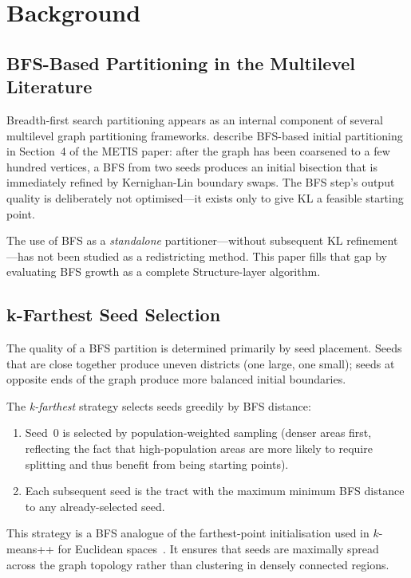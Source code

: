 \section{Background}
\label{sec:background}

\subsection{BFS-Based Partitioning in the Multilevel Literature}

Breadth-first search partitioning appears as an internal component of
several multilevel graph partitioning frameworks.
\citet{karypis1998} describe BFS-based initial partitioning in Section~4
of the METIS paper: after the graph has been coarsened to a few hundred
vertices, a BFS from two seeds produces an initial bisection that is
immediately refined by Kernighan-Lin boundary swaps.
The BFS step's output quality is deliberately not optimised---it exists
only to give KL a feasible starting point.

The use of BFS as a \emph{standalone} partitioner---without subsequent
KL refinement---has not been studied as a redistricting method.
This paper fills that gap by evaluating BFS growth as a complete
Structure-layer algorithm.

\subsection{k-Farthest Seed Selection}

The quality of a BFS partition is determined primarily by seed placement.
Seeds that are close together produce uneven districts (one large, one
small); seeds at opposite ends of the graph produce more balanced initial
boundaries.

The \emph{k-farthest} strategy selects seeds greedily by BFS distance:
\begin{enumerate}
\item Seed~0 is selected by population-weighted sampling (denser areas
  first, reflecting the fact that high-population areas are more likely
  to require splitting and thus benefit from being starting points).
\item Each subsequent seed is the tract with the maximum minimum BFS
  distance to any already-selected seed.
\end{enumerate}
This strategy is a BFS analogue of the farthest-point initialisation used
in $k$-means++ for Euclidean spaces~\citep{cormen2009}.
It ensures that seeds are maximally spread across the graph topology rather
than clustering in densely connected regions.

